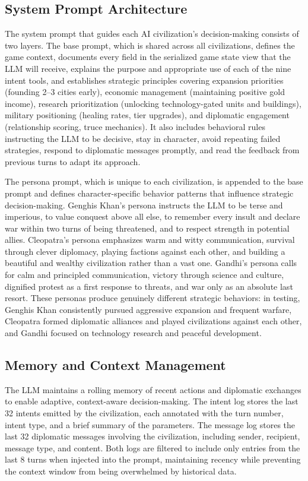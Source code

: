 \documentclass[conference]{IEEEtran}
\begin{document}
\subsection{System Prompt Architecture}

The system prompt that guides each AI civilization's decision-making consists of two layers. The base prompt, which is shared across all civilizations, defines the game context, documents every field in the serialized game state view that the LLM will receive, explains the purpose and appropriate use of each of the nine intent tools, and establishes strategic principles covering expansion priorities (founding 2--3 cities early), economic management (maintaining positive gold income), research prioritization (unlocking technology-gated units and buildings), military positioning (healing rates, tier upgrades), and diplomatic engagement (relationship scoring, truce mechanics). It also includes behavioral rules instructing the LLM to be decisive, stay in character, avoid repeating failed strategies, respond to diplomatic messages promptly, and read the feedback from previous turns to adapt its approach.

The persona prompt, which is unique to each civilization, is appended to the base prompt and defines character-specific behavior patterns that influence strategic decision-making. Genghis Khan's persona instructs the LLM to be terse and imperious, to value conquest above all else, to remember every insult and declare war within two turns of being threatened, and to respect strength in potential allies. Cleopatra's persona emphasizes warm and witty communication, survival through clever diplomacy, playing factions against each other, and building a beautiful and wealthy civilization rather than a vast one. Gandhi's persona calls for calm and principled communication, victory through science and culture, dignified protest as a first response to threats, and war only as an absolute last resort. These personas produce genuinely different strategic behaviors: in testing, Genghis Khan consistently pursued aggressive expansion and frequent warfare, Cleopatra formed diplomatic alliances and played civilizations against each other, and Gandhi focused on technology research and peaceful development.

\subsection{Memory and Context Management}

The LLM maintains a rolling memory of recent actions and diplomatic exchanges to enable adaptive, context-aware decision-making. The intent log stores the last 32 intents emitted by the civilization, each annotated with the turn number, intent type, and a brief summary of the parameters. The message log stores the last 32 diplomatic messages involving the civilization, including sender, recipient, message type, and content. Both logs are filtered to include only entries from the last 8 turns when injected into the prompt, maintaining recency while preventing the context window from being overwhelmed by historical data.
\end{document}
